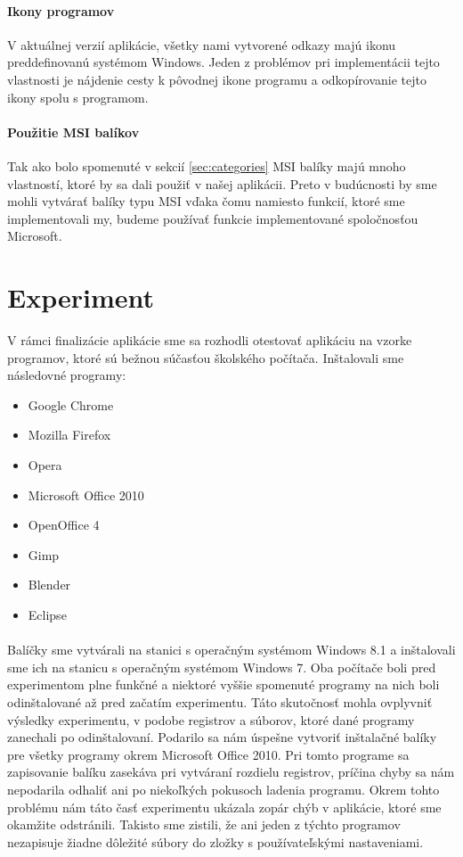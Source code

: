 \paragraph{Ikony programov}
V aktuálnej verzií aplikácie, všetky nami vytvorené odkazy majú ikonu preddefinovanú systémom Windows. Jeden z problémov pri implementácii tejto vlastnosti je nájdenie cesty k pôvodnej ikone programu a odkopírovanie tejto ikony spolu s programom. 

\paragraph{Použitie MSI balíkov}
Tak ako bolo spomenuté v sekcií \ref{sec:categories} MSI balíky majú mnoho vlastností, ktoré by sa dali použiť v našej aplikácii. Preto v budúcnosti by sme mohli vytvárať balíky typu MSI vďaka čomu namiesto funkcií, ktoré sme implementovali my, budeme používať funkcie implementované spoločnosťou Microsoft. 

\section{Experiment}
\label{sec:experiment}
V rámci finalizácie aplikácie sme sa rozhodli otestovať aplikáciu na vzorke programov, ktoré sú bežnou súčasťou školského počítača. Inštalovali sme následovné programy:
\begin{itemize}
\item Google Chrome
\item Mozilla Firefox
\item Opera
\item Microsoft Office 2010
\item OpenOffice 4
\item Gimp
\item Blender
\item Eclipse
\end{itemize}
\paragraph{}
Balíčky sme vytvárali na stanici s operačným systémom Windows 8.1 a inštalovali sme ich na stanicu s operačným systémom Windows 7. Oba počítače boli pred experimentom plne funkčné a niektoré vyššie spomenuté programy na nich boli odinštalované až pred začatím experimentu. Táto skutočnosť mohla ovplyvniť výsledky experimentu, v podobe registrov a súborov, ktoré dané programy zanechali po odinštalovaní. Podarilo sa nám úspešne vytvoriť inštalačné balíky pre všetky programy okrem Microsoft Office 2010. Pri tomto programe sa zapisovanie balíku zasekáva pri vytváraní rozdielu registrov, príčina chyby sa nám nepodarila odhaliť ani po niekoľkých pokusoch ladenia programu. Okrem tohto problému nám táto časť experimentu ukázala zopár chýb v aplikácie, ktoré sme okamžite odstránili. Takisto sme zistili, že ani jeden z týchto programov nezapisuje žiadne dôležité súbory do zložky s používateľskými nastaveniami.
